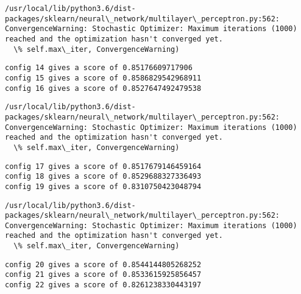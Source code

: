 \documentclass[11pt]{article}
\begin{document}
    \begin{Verbatim}[commandchars=\\\{\}]
/usr/local/lib/python3.6/dist-packages/sklearn/neural\_network/multilayer\_perceptron.py:562: ConvergenceWarning: Stochastic Optimizer: Maximum iterations (1000) reached and the optimization hasn't converged yet.
  \% self.max\_iter, ConvergenceWarning)

    \end{Verbatim}

    \begin{Verbatim}[commandchars=\\\{\}]
config 14 gives a score of 0.85176609717906
config 15 gives a score of 0.8586829542968911
config 16 gives a score of 0.8527647492479538

    \end{Verbatim}

    \begin{Verbatim}[commandchars=\\\{\}]
/usr/local/lib/python3.6/dist-packages/sklearn/neural\_network/multilayer\_perceptron.py:562: ConvergenceWarning: Stochastic Optimizer: Maximum iterations (1000) reached and the optimization hasn't converged yet.
  \% self.max\_iter, ConvergenceWarning)

    \end{Verbatim}

    \begin{Verbatim}[commandchars=\\\{\}]
config 17 gives a score of 0.8517679146459164
config 18 gives a score of 0.8529688327336493
config 19 gives a score of 0.8310750423048794

    \end{Verbatim}

    \begin{Verbatim}[commandchars=\\\{\}]
/usr/local/lib/python3.6/dist-packages/sklearn/neural\_network/multilayer\_perceptron.py:562: ConvergenceWarning: Stochastic Optimizer: Maximum iterations (1000) reached and the optimization hasn't converged yet.
  \% self.max\_iter, ConvergenceWarning)

    \end{Verbatim}

    \begin{Verbatim}[commandchars=\\\{\}]
config 20 gives a score of 0.8544144805268252
config 21 gives a score of 0.8533615925856457
config 22 gives a score of 0.8261238330443197

    \end{Verbatim}
\end{document}
